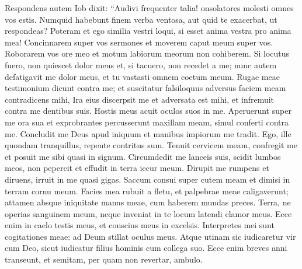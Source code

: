 \begin{biblechapter}  
\verse Respondens autem Iob dixit: 
\verse “Audivi frequenter talia! onsolatores molesti omnes vos estis. 
\verse Numquid habebunt finem verba ventosa, aut quid te exacerbat, ut respondeas? 
\verse Poteram et ego similia vestri loqui, si esset anima vestra pro anima mea! Concinnarem super vos sermones et moverem caput meum super vos. 
\verse Roborarem vos ore meo et motum labiorum meorum non cohiberem. 
\verse Si locutus fuero, non quiescet dolor meus et, si tacuero, non recedet a me; 
\verse nunc autem defatigavit me dolor meus, et tu vastasti omnem coetum meum. 
\verse Rugae meae testimonium dicunt contra me; et suscitatur falsiloquus adversus faciem meam contradicens mihi, 
\verse Ira eius discerpsit me et adversata est mihi, et infremuit contra me dentibus suis. Hostis meus acuit oculos suos in me. 
\verse Aperuerunt super me ora sua et exprobrantes percusserunt maxillam meam, simul conferti contra me. 
\verse Concludit me Deus apud iniquum et manibus impiorum me tradit. 
\verse Ego, ille quondam tranquillus, repente contritus sum. Tenuit cervicem meam, confregit me et posuit me sibi quasi in signum. 
\verse Circumdedit me lanceis suis, scidit lumbos meos, non pepercit et effudit in terra iecur meum. 
\verse Dirupit me rumpens et diruens, irruit in me quasi gigas. 
\verse Saccum consui super cutem meam et dimisi in terram cornu meum. 
\verse Facies mea rubuit a fletu, et palpebrae meae caligaverunt; 
\verse attamen absque iniquitate manus meae, cum haberem mundas preces. 
\verse Terra, ne operias sanguinem meum, neque inveniat in te locum latendi clamor meus. 
\verse Ecce enim in caelo testis meus, et conscius meus in excelsis. 
\verse Interpretes mei sunt cogitationes meae: ad Deum stillat oculus meus. 
\verse Atque utinam sic iudicaretur vir cum Deo, sicut iudicatur filius hominis cum collega suo. 
\verse Ecce enim breves anni transeunt, et semitam, per quam non revertar, ambulo. 
\end{biblechapter}


